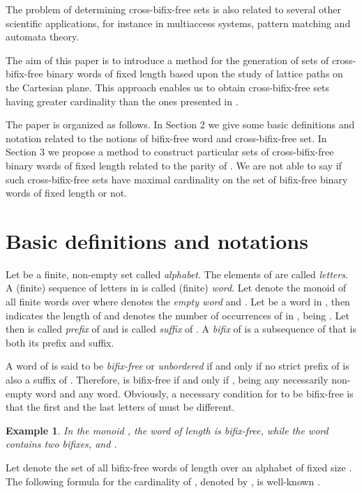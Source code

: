\documentclass[a4paper,11pt]{article}
\newtheorem{example}{Example}[section]
\begin{document}
The problem of determining cross-bifix-free sets is also related
to several other scientific applications, for instance in
multiaccess systems, pattern matching and automata theory.

The aim of this paper is to introduce a method for the generation
of sets of cross-bifix-free binary words of fixed length based
upon the study of lattice paths on the Cartesian plane. This
approach enables us to obtain cross-bifix-free sets having greater
cardinality than the ones presented in \cite{1}.

The paper is organized as follows. In Section 2 we give some basic
definitions and notation related to the notions of bifix-free word
and cross-bifix-free set. In Section 3 we propose a method to
construct particular sets of cross-bifix-free binary words of
fixed length  related to the parity of . We are not able to
say if such cross-bifix-free sets have maximal cardinality on the
set of bifix-free binary words of fixed length  or not.

\section{Basic definitions and notations}
Let  be a finite, non-empty set called \emph{alphabet}. The
elements of  are called \emph{letters}. A (finite) sequence of
letters in  is called (finite) \emph{word}. Let  denote
the monoid of all finite words over  where 
denotes the \emph{empty word} and . Let  be a word in , then 
indicates the length of  and  denotes the
number of occurrences of  in , being . Let
 then  is called \emph{prefix} of  and 
is called \emph{suffix} of . A \emph{bifix} of  is
a subsequence of  that is both its prefix and suffix.


A word  of  is said to be \emph{bifix-free} or
\emph{unbordered} \cite{7,11} if and only if no strict prefix of
 is also a suffix of . Therefore,  is
bifix-free if and only if , being  any
necessarily non-empty word and  any word. Obviously, a
necessary condition for  to be bifix-free is that the
first and the last letters of  must be different.
\begin{example}
In the monoid , the word  of length  is
bifix-free, while the word  contains two bifixes, 
and .
\end{example}


Let  denote the set of all bifix-free words of length 
over an alphabet of fixed size . The following formula for the
cardinality of , denoted by , is well-known
\cite{11}.
\end{document}
